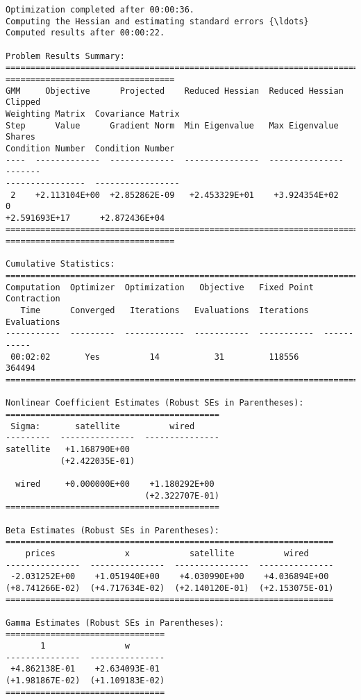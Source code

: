 \begin{Verbatim}[commandchars=\\\{\}]
Optimization completed after 00:00:36.
Computing the Hessian and estimating standard errors {\ldots}
Computed results after 00:00:22.

Problem Results Summary:
================================================================================
==================================
GMM     Objective      Projected    Reduced Hessian  Reduced Hessian  Clipped
Weighting Matrix  Covariance Matrix
Step      Value      Gradient Norm  Min Eigenvalue   Max Eigenvalue   Shares
Condition Number  Condition Number
----  -------------  -------------  ---------------  ---------------  -------
----------------  -----------------
 2    +2.113104E+00  +2.852862E-09   +2.453329E+01    +3.924354E+02      0
+2.591693E+17      +2.872436E+04
================================================================================
==================================

Cumulative Statistics:
===========================================================================
Computation  Optimizer  Optimization   Objective   Fixed Point  Contraction
   Time      Converged   Iterations   Evaluations  Iterations   Evaluations
-----------  ---------  ------------  -----------  -----------  -----------
 00:02:02       Yes          14           31         118556       364494
===========================================================================

Nonlinear Coefficient Estimates (Robust SEs in Parentheses):
===========================================
 Sigma:       satellite          wired
---------  ---------------  ---------------
satellite   +1.168790E+00
           (+2.422035E-01)

  wired     +0.000000E+00    +1.180292E+00
                            (+2.322707E-01)
===========================================

Beta Estimates (Robust SEs in Parentheses):
==================================================================
    prices              x            satellite          wired
---------------  ---------------  ---------------  ---------------
 -2.031252E+00    +1.051940E+00    +4.030990E+00    +4.036894E+00
(+8.741266E-02)  (+4.717634E-02)  (+2.140120E-01)  (+2.153075E-01)
==================================================================

Gamma Estimates (Robust SEs in Parentheses):
================================
       1                w
---------------  ---------------
 +4.862138E-01    +2.634093E-01
(+1.981867E-02)  (+1.109183E-02)
================================
    \end{Verbatim}

